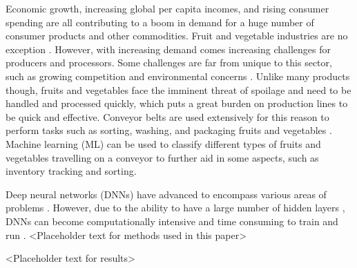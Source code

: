 Economic growth, increasing global per capita incomes, and rising consumer spending are all contributing to a boom in demand for a huge number of consumer products and other commodities. Fruit and vegetable industries are no exception \cite{b1_1}. However, with increasing demand comes increasing challenges for producers and processors. Some challenges are far from unique to this sector, such as growing competition \cite{b1_2} and environmental concerns \cite{b1_3}. Unlike many products though, fruits and vegetables face the imminent threat of spoilage and need to be handled and processed quickly, which puts a great burden on production lines to be quick and effective. Conveyor belts are used extensively for this reason to perform tasks such as sorting, washing, and packaging fruits and vegetables \cite{b1_4}. Machine learning (ML) can be used to classify different types of fruits and vegetables travelling on a conveyor to further aid in some aspects, such as inventory tracking and sorting.

Deep neural networks (DNNs) have advanced to encompass various areas of problems \cite{b1_5,b1_6}. However, due to the ability to have a large number of hidden layers \cite{b1_7}, DNNs can become computationally intensive and time consuming to train and run \cite{b1_8}. <Placeholder text for methods used in this paper>

<Placeholder text for results>
